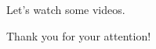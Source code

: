 \documentclass{beamer}
\begin{document}
\begin{frame} 
 
\begin{center}
\Huge{Let's watch some videos.}
\end{center} 
 
\end{frame} 

 
 
\begin{frame} 
 
\begin{center}
\Huge{Thank you for your attention!}
\end{center} 
 
\end{frame} 
 
 
 
% 
% 
% 
% 
 
 
 
 
 
% 
% 
% 
% 
%
%  
 
 
 
 
 
 
\end{document}
